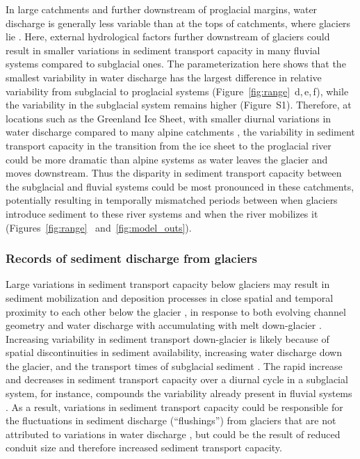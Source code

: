 \documentclass[11pt]{article}
\begin{document}
\begin{spacing}{1}
          In large catchments and further downstream of proglacial margins, water discharge is generally less variable than at the tops of catchments, where glaciers lie \citep[c.f.][]{costa2017,vanas2017,delaney2018,hasholt2018}.
          Here, external hydrological factors further downstream of glaciers could result in smaller variations in sediment transport capacity in many fluvial systems compared to subglacial ones.
          The parameterization here shows that the smallest variability in water discharge has the largest difference in relative variability from subglacial to proglacial systems (Figure~\ref{fig:range}\, d,\,e,\,f), while the variability in the subglacial system remains higher (Figure~S1).
          Therefore, at locations such as the Greenland Ice Sheet, with smaller diurnal variations in water discharge compared to many alpine catchments \citep[c.f.][]{delaney2018,hasholt2018}, the variability in sediment transport capacity in the transition from the ice sheet to the proglacial river could be more dramatic than alpine systems as water leaves the glacier and moves downstream.
          Thus the disparity in sediment transport capacity between the subglacial and fluvial systems could be most pronounced in these catchments, potentially resulting in temporally mismatched periods between when glaciers introduce sediment to these river systems  and when the river mobilizes it (Figures~\ref{fig:range}~ and~\ref{fig:model_outs}).
        
          
          \subsubsection{Records of sediment discharge  from glaciers}
        
          Large variations in sediment transport capacity below glaciers may result in sediment mobilization and deposition processes in close spatial and temporal proximity to each other below the glacier \citep{gimbert2016,perolo2018}, in response to both evolving channel geometry and water discharge with accumulating with melt down-glacier \citep{beaud2018,delaney2019}.
          Increasing variability in sediment transport down-glacier is likely because of spatial discontinuities in sediment availability, increasing water discharge down the glacier, and the transport times of subglacial sediment \citep{williams1989,delaney2019}.
          The rapid increase and decreases in sediment transport capacity over a diurnal cycle in a subglacial system, for instance, compounds the variability already present in fluvial systems \citep{williams1989,jerolmack2010}.
          As a result, variations in sediment transport capacity could be responsible for the fluctuations in sediment discharge (``flushings'') from glaciers that are not attributed to variations in water discharge \citep[e.g.][]{richards2003,swift2021}, but could be the result of reduced conduit size and therefore increased sediment transport capacity.


\end{spacing}
\end{document}
